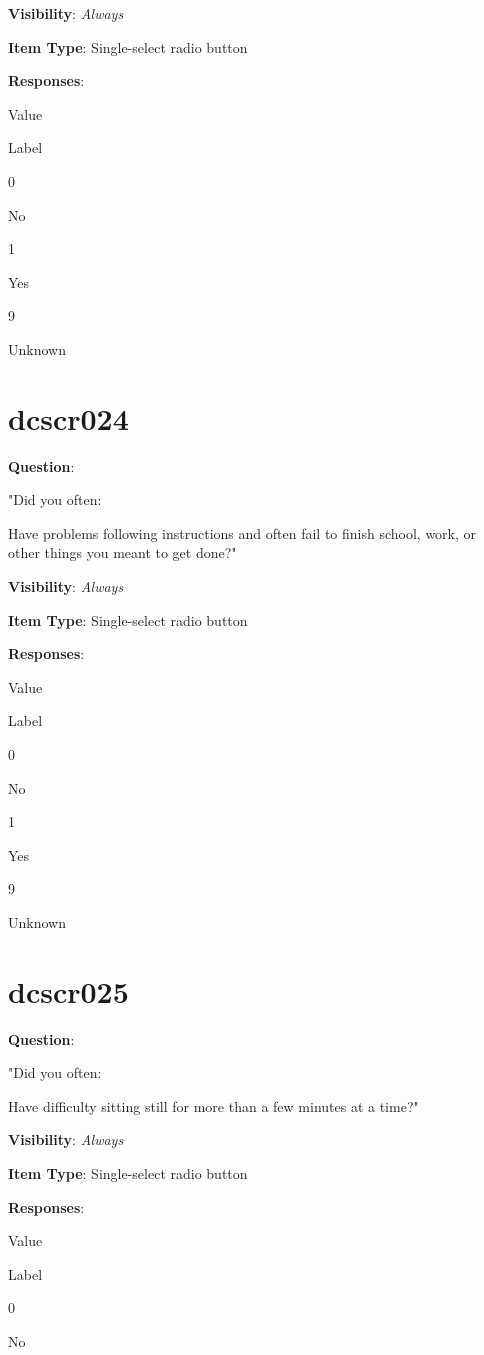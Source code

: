 \documentclass[]{book}
\begin{document}
\textbf{Visibility}: \emph{Always}

\textbf{Item Type}: Single-select radio button

\textbf{Responses}:

Value

Label

0

No

1

Yes

9

Unknown

\hypertarget{dcscr024}{%
\section{dcscr024}\label{dcscr024}}

\textbf{Question}:

"Did you often:

Have problems following instructions and often fail to finish school, work, or other things you meant to get done?"

\textbf{Visibility}: \emph{Always}

\textbf{Item Type}: Single-select radio button

\textbf{Responses}:

Value

Label

0

No

1

Yes

9

Unknown

\hypertarget{dcscr025}{%
\section{dcscr025}\label{dcscr025}}

\textbf{Question}:

"Did you often:

Have difficulty sitting still for more than a few minutes at a time?"

\textbf{Visibility}: \emph{Always}

\textbf{Item Type}: Single-select radio button

\textbf{Responses}:

Value

Label

0

No
\end{document}
